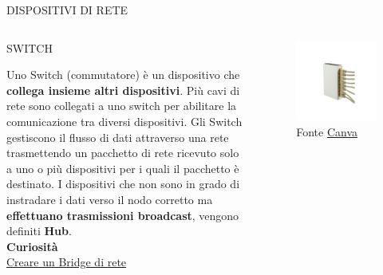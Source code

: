 \documentclass[aspectratio=1610]{beamer}
\begin{document}
\begin{frame}{DISPOSITIVI DI RETE}
    \begin{columns}
            \justifying
            \begin{alertblock}{SWITCH}
                \begin{minipage}{0.96\linewidth}
                    \justifying
                    Uno Switch (commutatore) è un dispositivo che \textbf{collega insieme altri dispositivi}. 
                    Più cavi di rete sono collegati a uno switch per abilitare la comunicazione 
                    tra diversi dispositivi. Gli Switch gestiscono il flusso di dati attraverso 
                    una rete trasmettendo un pacchetto di rete ricevuto solo a uno o più 
                    dispositivi per i quali il pacchetto è destinato. I dispositivi che non sono in grado 
                    di instradare i dati verso il nodo corretto ma \textbf{effettuano trasmissioni broadcast}, 
                    vengono definiti \textbf{Hub}.\\
                    \bigskip
                    \tiny{\textbf{Curiosità}}\\
                    \tiny{\href{https://www.fastweb.it/fastweb-plus/digital-magazine/cos-e-un-bridge-di-rete-e-come-crearne-uno/}{Creare un Bridge di rete}}
                \end{minipage}
            \end{alertblock}
            \begin{figure}
                \includegraphics[width=\linewidth]{img/hubbridgeswitch.png}
                \caption{{Fonte \href{https://www.canva.com/}{Canva}}}
            \end{figure}
    \end{columns}
\end{frame}
\end{document}
